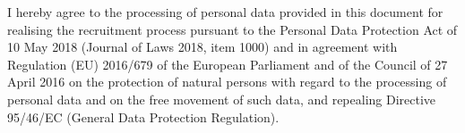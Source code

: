 \documentclass[9pt]{style/developercv}
\begin{document}

\vspace{1.00cm}

\begin{minipage}[t]{1\textwidth}
	\footnotesize{I hereby agree to the processing of personal data provided in this document for 
	realising the recruitment process pursuant to the Personal Data Protection Act
	of 10 May 2018 (Journal of Laws 2018, item 1000) and in agreement with Regulation (EU) 
	2016/679 of the European Parliament and of the Council of 27 April 2016 on the 
	protection of natural persons with regard to the processing of personal data and on 
	the free movement of such data, and repealing Directive 95/46/EC (General Data 
	Protection Regulation).}
\end{minipage}
\end{document}
